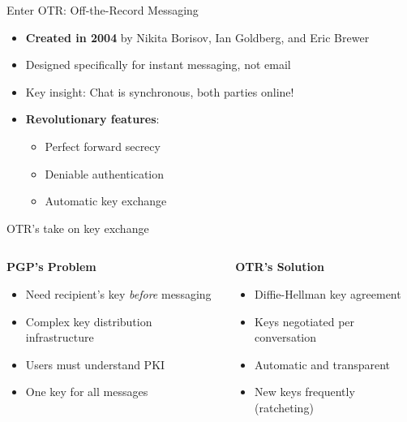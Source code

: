 \documentclass[aspectratio=169, lualatex, handout]{beamer}
\begin{document}
\begin{frame}{Enter OTR: Off-the-Record Messaging}
	\begin{itemize}
		\item \textbf{Created in 2004} by Nikita Borisov, Ian Goldberg, and Eric Brewer
		\item Designed specifically for instant messaging, not email
		\item Key insight: Chat is synchronous, both parties online!
		\item \textbf{Revolutionary features}:
		      \begin{itemize}
			      \item Perfect forward secrecy
			      \item Deniable authentication
			      \item Automatic key exchange
		      \end{itemize}
	\end{itemize}
\end{frame}

\begin{frame}{OTR's take on key exchange}
	\begin{columns}
		\begin{column}{0.5\textwidth}
			\textbf{PGP's Problem}
			\begin{itemize}
				\item Need recipient's key \textit{before} messaging
				\item Complex key distribution infrastructure
				\item Users must understand PKI
				\item One key for all messages
			\end{itemize}
		\end{column}
		\begin{column}{0.5\textwidth}
			\textbf{OTR's Solution}
			\begin{itemize}
				\item Diffie-Hellman key agreement
				\item Keys negotiated per conversation
				\item Automatic and transparent
				\item New keys frequently (ratcheting)
			\end{itemize}
		\end{column}
	\end{columns}
\end{frame}
\end{document}
